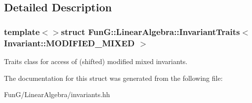 \subsection{Detailed Description}
\subsubsection*{template$<$$>$struct Fun\-G\-::\-Linear\-Algebra\-::\-Invariant\-Traits$<$ Invariant\-::\-M\-O\-D\-I\-F\-I\-E\-D\-\_\-\-M\-I\-X\-E\-D $>$}

Traits class for access of (shifted) modified mixed invariants. 

The documentation for this struct was generated from the following file\-:\begin{DoxyCompactItemize}
\item 
Fun\-G/\-Linear\-Algebra/invariants.\-hh\end{DoxyCompactItemize}

